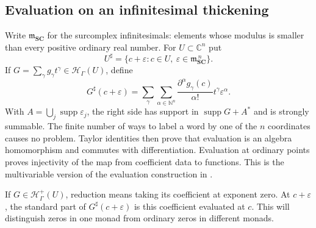 \documentclass[11pt,letterpaper]{article}
\theoremstyle{definition}
\theoremstyle{remark}
\newcommand{\SC}{\mathbf{SC}}
\newcommand{\C}{\mathbb C}
\newcommand{\N}{\mathbb N}
\newcommand{\HH}{\mathcal H}
\newcommand{\mm}{\mathfrak m}
\newcommand{\supp}{\operatorname{supp}}
\newcommand{\sh}{^{\sharp}}
\newcommand{\Hp}{\HH^{+}_{\Gamma}}
\newcommand{\Hh}{\HH_{\Gamma}}
\begin{document}
\subsection{Evaluation on an infinitesimal thickening}
Write $\mm_{\SC}$ for the surcomplex infinitesimals: elements whose modulus is smaller than every positive ordinary real number. For $U\subset\C^n$ put
\[
 U\sh=\{c+\varepsilon:c\in U,\ \varepsilon\in\mm_{\SC}^{\,n}\}.
\]
If $G=\sum_\gamma g_\gamma t^\gamma\in\Hh(U)$, define
\begin{equation}\label{eq:evaluation}
 G\sh(c+\varepsilon)=
 \sum_{\gamma}\sum_{\alpha\in\N^n}
   \frac{\partial^\alpha g_\gamma(c)}{\alpha!}
       t^\gamma\varepsilon^\alpha.
\end{equation}
With $A=\bigcup_j\supp\varepsilon_j$, the right side has support in $\supp G+A^*$ and is strongly summable. The finite number of ways to label a word by one of the $n$ coordinates causes no problem. Taylor identities then prove that evaluation is an algebra homomorphism and commutes with differentiation. Evaluation at ordinary points proves injectivity of the map from coefficient data to functions. This is the multivariable version of the evaluation construction in \cite{Supplied}.

If $G\in\Hp(U)$, reduction means taking its coefficient at exponent zero. At $c+\varepsilon$, the standard part of $G\sh(c+\varepsilon)$ is this coefficient evaluated at $c$. This will distinguish zeros in one monad from ordinary zeros in different monads.
\end{document}
